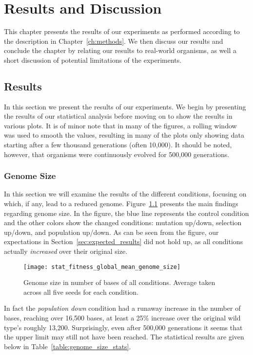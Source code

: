\chapter{Results and Discussion}\label{ch:results_discussion}
This chapter presents the results of our experiments as performed according to the description in Chapter~\ref{ch:methods}. We then discuss our results and conclude the chapter by relating our results to real-world organisms, as well a short discussion of potential limitations of the experiments.

\section{Results}\label{results}
In this section we present the results of our experiments. We begin by presenting the results of our statistical analysis before moving on to show the results in various plots. It is of minor note that in many of the figures, a rolling window was used to smooth the values, resulting in many of the plots only showing data starting after a few thousand generations (often 10,000). It should be noted, however, that organisms were continuously evolved for 500,000 generations. 

\subsection{Genome Size}\label{sec:genome_size}
In this section we will examine the results of the different conditions, focusing on which, if any, lead to a reduced genome. Figure~\ref{fig:genome_size}
presents the main findings regarding genome size. In the figure, the blue line represents the control condition and the other colors show the changed conditions: mutation up/down, selection up/down, and population up/down. As can be seen from the figure, our expectations in Section~\ref{sec:expected_results} did not hold up, as all conditions actually \textit{increased} over their original size.
\begin{figure}[H]
	\texttt{[image: stat\_fitness\_global\_mean\_genome\_size]}
	\centering
	\caption[Genome size]{Genome size in number of bases of all conditions. Average taken across all five seeds for each condition.}
	\label{fig:genome_size}
\end{figure}
In fact the \textit{population down} condition had a runaway increase in the number of bases, reaching over 16,500 bases, at least a 25\% increase over the original wild type's roughly 13,200. Surprisingly, even after 500,000 generations it seems that the upper limit may still not have been reached. The statistical results are given below in Table~\ref{table:genome_size_stats}.

